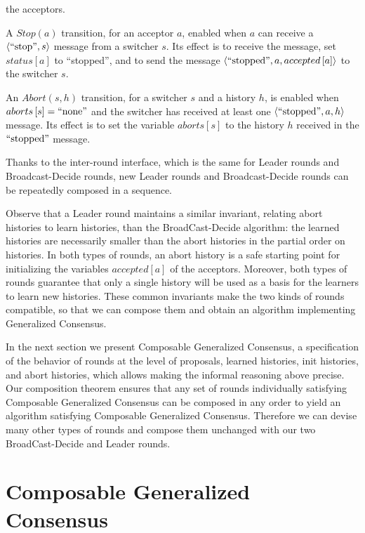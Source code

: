\begin{compactitem}
  the acceptors. 
\item A $Stop\left( a \right)$ transition, for an acceptor $a$,
  enabled when $a$ can receive a $\left\langle\text{``stop''},s\right\rangle$ message
  from a switcher $s$. Its effect is to receive the message, set
  $status\left[ a \right]$ to ``stopped'', and to send the
  message $\left\langle\text{``stopped''},a,accepted\left[ a \right]\right\rangle$ to the
  switcher $s$. 
\item An $Abort\left( s, h \right)$ transition, for a switcher $s$ and a history $h$, is enabled when $aborts\left[ s \right] = \text{``none''}$ and
  the switcher has received at least one $\left\langle\text{``stopped''}, a, h\right\rangle$ message. Its effect is to set the variable $aborts\left[ s \right]$ to the
  history $h$ received in the $\text{``stopped''}$ message.
\end{compactitem}

Thanks to the inter-round interface, which is the same for Leader rounds and Broadcast-Decide rounds, new Leader rounds and Broadcast-Decide rounds can be repeatedly composed in a sequence. 

Observe that a Leader round maintains a similar invariant, relating abort histories to learn histories, than the BroadCast-Decide algorithm:
the learned histories are necessarily smaller than the abort histories in the partial order on histories. In both types of rounds, an abort history is
a safe starting point for initializing the variables $accepted\left[ a \right]$ of the acceptors. Moreover, both types of rounds guarantee that only a
single history will be used as a basis for the learners to learn new histories. These common invariants make the two kinds of rounds compatible, so that we can compose them and obtain an algorithm implementing Generalized Consensus.

In the next section we present Composable Generalized Consensus, a specification of the behavior of rounds at the level of proposals, learned histories, init histories, and abort histories, which allows making the informal reasoning above precise.
Our composition theorem ensures that any set of rounds individually satisfying Composable Generalized Consensus can be composed in any order to yield an algorithm satisfying Composable Generalized Consensus. Therefore we can devise many other types of rounds and compose them unchanged with our two BroadCast-Decide and Leader rounds.

\section{Composable Generalized Consensus}
\label{sec:aca}

